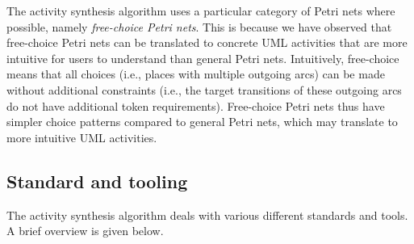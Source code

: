 \documentclass{article}
\theoremstyle{definition}
\begin{document}
\begin{description}
	The activity synthesis algorithm uses a particular category of Petri nets where possible, namely \emph{free-choice Petri nets}.
	This is because we have observed that free-choice Petri nets can be translated to concrete UML activities that are more intuitive for users to understand than general Petri nets.
	Intuitively, free-choice means that all choices (i.e., places with multiple outgoing arcs) can be made without additional constraints (i.e., the target transitions of these outgoing arcs do not have additional token requirements).
	Free-choice Petri nets thus have simpler choice patterns compared to general Petri nets, which may translate to more intuitive UML activities.
\end{description}

\subsection{Standard and tooling}
\label{sec:prelims:standards}

The activity synthesis algorithm deals with various different standards and tools.
A brief overview is given below.
\end{document}
